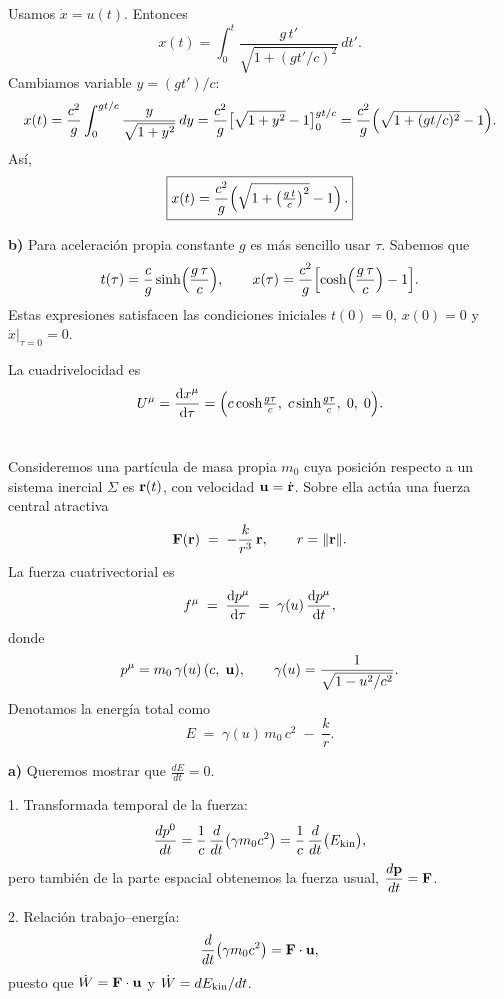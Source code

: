\documentclass{article}
\begin{document}
Usamos
\(\dot x = u(t)\). Entonces
\[
x(t) = \int_0^t \frac{g\,t'}{\sqrt{1 + (g t'/c)^2}}\,dt'.
\]
Cambiamos variable \(y = (g t')/c\):
\[
x(t) = \frac{c^2}{g}
\int_0^{gt/c} \frac{y}{\sqrt{1+y^2}}\,dy
= \frac{c^2}{g}
\bigl[\sqrt{1+y^2}-1\bigr]_{0}^{gt/c}
= \frac{c^2}{g}\Bigl(\sqrt{1+(gt/c)^2}-1\Bigr).
\]
Así,
\[
\boxed{x(t) = \frac{c^2}{g}\Bigl(\sqrt{1+\bigl(\tfrac{g\,t}{c}\bigr)^2}-1\Bigr)\,.}
\]


\textbf{b)}
Para aceleración propia constante \(g\) es más sencillo usar \(\tau\). Sabemos que
\[
t(\tau) = \frac{c}{g}\sinh\Bigl(\frac{g\,\tau}{c}\Bigr),
\qquad
x(\tau) = \frac{c^2}{g}\Bigl[\cosh\Bigl(\frac{g\,\tau}{c}\Bigr)-1\Bigr].
\]
Estas expresiones satisfacen las condiciones iniciales \(t(0)=0\), \(x(0)=0\) y
\(\dot x\bigl|_{\tau=0}=0\).  

La cuadrivelocidad es
\[
U^\mu = \dv{x^\mu}{\tau}
= \Bigl(c \cosh\!\tfrac{g\tau}{c},\;
           c \sinh\!\tfrac{g\tau}{c},\;0,\;0\Bigr).
\]









\section{}
Consideremos una partícula de masa propia \(m_0\) cuya posición respecto a un sistema inercial \(\Sigma\) es \(\vb r(t)\), con velocidad \(\vb u = \dot{\vb r}\). Sobre ella actúa una fuerza central atractiva
\[
\vb F(\vb r) \;=\; -\frac{k}{r^3}\,\vb r,
\qquad r = \|\vb r\|.
\]
La fuerza cuatrivectorial es
\[
f^\mu \;=\; \dv{p^\mu}{\tau}
\;=\;\gamma(u)\,\dv{p^\mu}{t},
\]
donde
\[
p^\mu = m_0\,\gamma(u)\,(c,\;\vb u),
\qquad
\gamma(u)=\frac{1}{\sqrt{1-u^2/c^2}}.
\]
Denotamos la energía total como
\[
E \;=\; \gamma(u)\,m_0\,c^2 \;-\;\frac{k}{r}.
\]



\textbf{a) } Queremos mostrar que \(\displaystyle \frac{dE}{dt}=0\). 

1. Transformada temporal de la fuerza:
\[
\frac{dp^0}{dt}
= \frac{1}{c}\,\frac{d}{dt}\bigl(\gamma m_0 c^2\bigr)
= \frac{1}{c}\,\frac{d}{dt}\bigl(E_{\rm kin}\bigr),
\]
pero también de la parte espacial obtenemos la fuerza usual,
\(\displaystyle \frac{d\vb p}{dt}=\vb F\).

2. Relación trabajo–energía:
\[
\frac{d}{dt}\bigl(\gamma m_0 c^2\bigr)
= \vb F\cdot\vb u,
\]
puesto que \(\dot W = \vb F\cdot\vb u\) y \(\dot W = dE_{\rm kin}/dt\).
\end{document}
